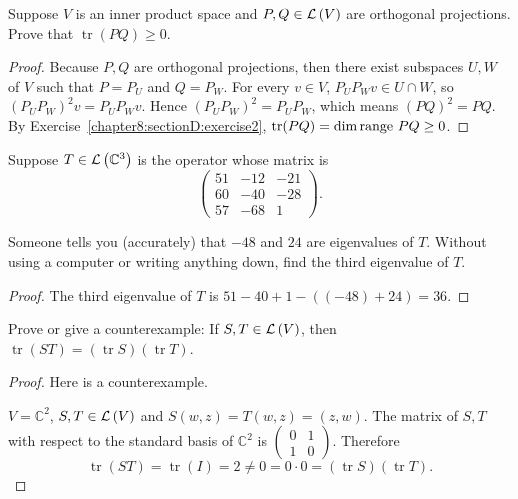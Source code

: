 \begin{exercise}\label{chapter8:sectionD:exercise6}
    Suppose $V$ is an inner product space and $P, Q\in\mathcal{L}\left({V}\right)$ are orthogonal projections. Prove that $\operatorname{tr}(PQ) \geq 0$.
\end{exercise}

\begin{proof}
    Because $P, Q$ are orthogonal projections, then there exist subspaces $U, W$ of $V$ such that $P = P_{U}$ and $Q = P_{W}$. For every $v\in V$, $P_{U}P_{W}v\in U\cap W$, so ${(P_{U}P_{W})}^{2}v = P_{U}P_{W}v$. Hence ${(P_{U}P_{W})}^{2} = P_{U}P_{W}$, which means ${(PQ)}^{2} = PQ$. By Exercise~\ref{chapter8:sectionD:exercise2}, $\operatorname{tr}(PQ) = \dim\operatorname{range}\,{PQ}\geq 0$.
\end{proof}
\newpage

\begin{exercise}\label{chapter8:sectionD:exercise7}
    Suppose $T\in\mathcal{L}\left({\mathbb{C}^{3}}\right)$ is the operator whose matrix is
    \[
        \begin{pmatrix}
            51 & -12 & -21 \\
            60 & -40 & -28 \\
            57 & -68 & 1
        \end{pmatrix}.
    \]

    Someone tells you (accurately) that $-48$ and $24$ are eigenvalues of $T$. Without using a computer or writing anything down, find the third eigenvalue of $T$.
\end{exercise}

\begin{proof}
    The third eigenvalue of $T$ is $51 - 40 + 1 - ((-48) + 24) = 36$.
\end{proof}
\newpage

\begin{exercise}\label{chapter8:sectionD:exercise8}
    Prove or give a counterexample: If $S, T \in \mathcal{L}\left({V}\right)$, then $\operatorname{tr}(ST) = (\operatorname{tr} S)(\operatorname{tr} T)$.
\end{exercise}

\begin{proof}
    Here is a counterexample.

    $V = \mathbb{C}^{2}$, $S, T\in\mathcal{L}\left({V}\right)$ and $S(w, z) = T(w, z) = (z, w)$. The matrix of $S, T$ with respect to the standard basis of $\mathbb{C}^{2}$ is $\begin{pmatrix}0 & 1 \\ 1 & 0\end{pmatrix}$. Therefore
    \[
        \operatorname{tr}(ST) = \operatorname{tr}(I) = 2 \ne 0 = 0\cdot 0 = (\operatorname{tr} S)(\operatorname{tr} T).
    \]
\end{proof}
\newpage

